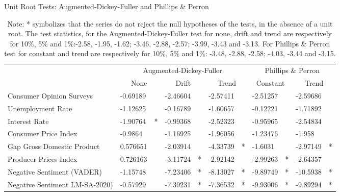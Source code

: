 \begin{table}[!h]
\label{tab:urlevel}
\caption{Unit Root Tests: Augmented-Dickey-Fuller and Phillips \& Perron}
\begin{adjustbox}{max width=\textwidth}
\begin{tabular}{lllllllllll}
\hline
                               & \multicolumn{6}{c|}{Augmented-Dickey-Fuller}                                        & \multicolumn{4}{c}{Phillips \& Perron}                    \\ \cline{2-11} 
                               & \multicolumn{2}{c|}{None} & \multicolumn{2}{c|}{Drift} & \multicolumn{2}{c|}{Trend} & \multicolumn{2}{c|}{Constant} & \multicolumn{2}{c}{Trend} \\ \hline
Consumer Opinion Surveys       & -0.69189        &         & -2.46604        &          & -2.57411        &          & -2.51257          &           & -2.59686        &         \\
Unemployment Rate              & -1.12625        &         & -0.16789        &          & -1.60657        &          & -0.12221          &           & -1.71892        &         \\
Interest Rate                  & -1.90764        & *       & -0.99368        &          & -2.52323        &          & -0.95965          &           & -2.54834        &         \\
Consumer Price Index           & -0.9864         &         & -1.16925        &          & -1.96056        &          & -1.23476          &           & -1.958          &         \\
Gap Gross Domestic Product     & 0.576651        &         & -2.03914        &          & -4.33739        & *        & -1.6031           &           & -2.97149        & *        \\
Producer Prices Index          & 0.726163        &         & -3.11724        & *        & -2.92142        &          & -2.99263          & *         & -2.64357        &         \\
Negative Sentiment (VADER)     & -1.15748        &         & -7.23406        & *        & -8.13027        & *        & -9.89749          & *         & -10.5938        & *       \\
Negative Sentiment LM-SA-2020) & -0.57929        &         & -7.39231        & *        & -7.36532        & *        & -9.93006          & *         & -9.89294        & *       \\ \hline
\end{tabular}
\end{adjustbox}
\caption*{Note: * symbolizes that the series do not reject the null hypotheses of the tests, in the absence of a unit root. The test statistics, for the Augmented-Dickey-Fuller test for none, drift and trend are respectively for 10\%, 5\% and 1\%:-2.58, -1.95, -1.62; -3.46, -2.88, -2.57; -3.99, -3.43 and -3.13. For Phillips \& Perron test for constant and trend are respectively for 10\%, 5\% and 1\%: -3.48, -2.88, -2.58; -4.03, -3.44 and -3.15.}

\end{table}


